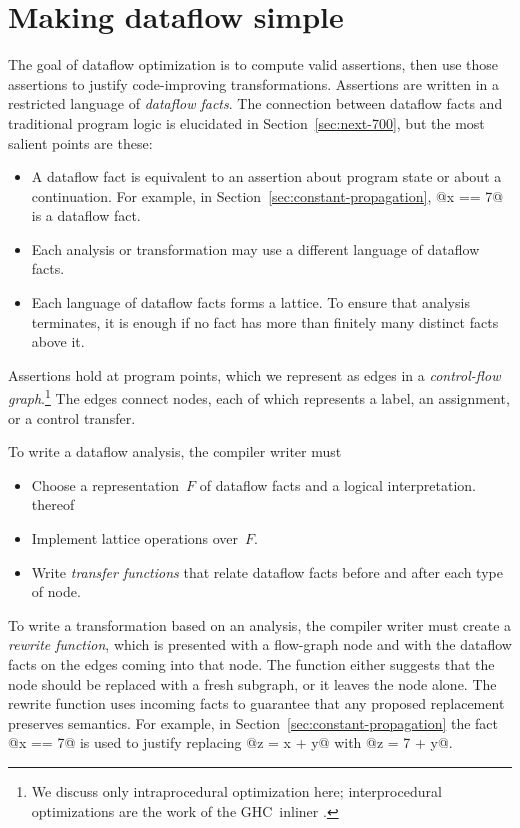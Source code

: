 \documentclass[blockstyle,preprint,nocopyrightspace]{sigplanconf}
\let\cite\citep
\newcommand\secref[1]{Section~\ref{sec:#1}}
\newcommand\seclabel[1]{\label{sec:#1}}
\begin{document}
  
\section {Making dataflow simple}

\seclabel{making-simple}

\seclabel{create-analysis}

The goal of dataflow optimization is to compute valid
assertions, then use those assertions to justify code-improving
transformations.
%
%
Assertions are written in a restricted
language of \emph{dataflow facts}.
The connection between dataflow facts and
\ifpagetuning\else traditional \fi
program logic is
elucidated in \secref{next-700}, but the most salient points are
these:
\begin{itemize}
\item
A dataflow fact is equivalent to an assertion about program state or
about a continuation.
For example, in \secref{constant-propagation}, @x == 7@ is a dataflow
fact. 
\item
Each analysis or transformation may use a different language of
dataflow facts.
\item
Each language of dataflow facts forms a lattice.
To ensure that analysis terminates,
it is enough if
no fact has more than finitely many distinct facts above it.
\end{itemize}


Assertions hold at program points, which we represent as edges in
a \emph{control-flow graph}.\footnote
{We discuss only intraprocedural optimization here;
interprocedural optimizations are the work of the GHC~inliner
\cite{peyton-jones:secrets-inliner}.} 
The edges connect nodes, each of which represents a label, an assignment, or
a control transfer.

To write a dataflow analysis, the compiler
writer must 
\begin{itemize}
\item
Choose a representation~$F$ of dataflow facts and a logical interpretation.
thereof
\item
Implement lattice operations over~$F$.
\item
Write \emph{transfer functions} that relate dataflow facts before and
after each type of node.
\end{itemize}

To write a transformation based on an analysis, the compiler writer
must create a \emph{rewrite function}, which is presented with a
flow-graph node and with the dataflow facts on the edges coming
into that node.
The function either suggests that the node should be replaced with a
fresh subgraph, or it leaves the node alone.
The rewrite function uses incoming facts to guarantee that
any proposed replacement preserves semantics.
For example, in \secref{constant-propagation} the fact @x == 7@ is
used to justify replacing @z = x + y@ with @z = 7 + y@.
\end{document}
